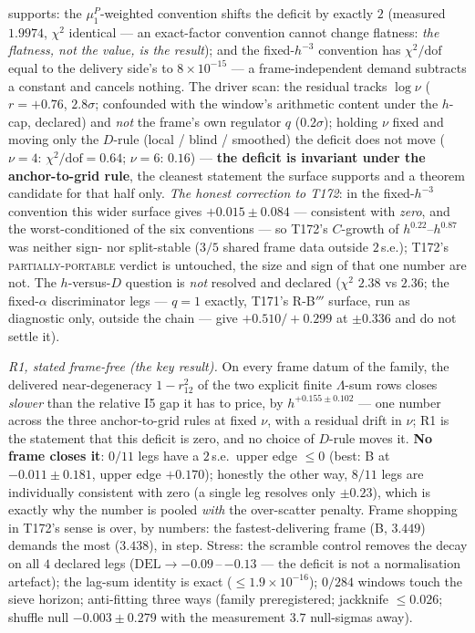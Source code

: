 \documentclass[11pt,a4paper]{article}
\begin{document}
supports: the $\mu^P_1$-weighted convention shifts the deficit by
exactly $2$ (measured $1.9974$, $\chi^2$ identical --- an exact-factor
convention cannot change flatness: \emph{the flatness, not the value,
is the result}); and the fixed-$h^{-3}$ convention has
$\chi^2/\mathrm{dof}$ equal to the delivery side's to $8\times10^{-15}$
--- a frame-independent demand subtracts a constant and cancels
nothing. The driver scan: the residual tracks $\log\nu$ ($r=+0.76$,
$2.8\sigma$; confounded with the window's arithmetic content under the
$h$-cap, declared) and \emph{not} the frame's own regulator $q$
($0.2\sigma$); holding $\nu$ fixed and moving only the $D$-rule (local
/ blind / smoothed) the deficit does not move ($\nu=4$:
$\chi^2/\mathrm{dof}=0.64$; $\nu=6$: $0.16$) --- \textbf{the deficit is
invariant under the anchor-to-grid rule}, the cleanest statement the
surface supports and a theorem candidate for that half only.
\emph{The honest correction to T172}: in the fixed-$h^{-3}$ convention
this wider surface gives $+0.015\pm0.084$ --- consistent with
\emph{zero}, and the worst-conditioned of the six conventions --- so
T172's $C$-growth of $h^{0.22}$--$h^{0.87}$ was neither sign- nor
split-stable ($3/5$ shared frame data outside $2$\,s.e.); T172's
\textsc{partially-portable} verdict is untouched, the size and sign of
that one number are not. The $h$-versus-$D$ question is \emph{not}
resolved and declared ($\chi^2$ $2.38$ vs $2.36$; the fixed-$\alpha$
discriminator legs --- $q=1$ exactly, T171's R-B$'''$ surface, run as
diagnostic only, outside the chain --- give $+0.510/+0.299$ at
$\pm0.336$ and do not settle it).

\emph{R1, stated frame-free (the key result).} On every frame datum of
the family, the delivered near-degeneracy $1-r_{12}^2$ of the two
explicit finite $\Lambda$-sum rows closes \emph{slower} than the
relative I5 gap it has to price, by $h^{+0.155\pm0.102}$ --- one number
across the three anchor-to-grid rules at fixed $\nu$, with a residual
drift in $\nu$; R1 is the statement that this deficit is zero, and no
choice of $D$-rule moves it. \textbf{No frame closes it}: $0/11$ legs
have a $2$\,s.e.\ upper edge $\le0$ (best: B at $-0.011\pm0.181$, upper
edge $+0.170$); honestly the other way, $8/11$ legs are individually
consistent with zero (a single leg resolves only $\pm0.23$), which is
exactly why the number is pooled \emph{with} the over-scatter penalty.
Frame shopping in T172's sense is over, by numbers: the
fastest-delivering frame (B, $3.449$) demands the most ($3.438$), in
step. Stress: the scramble control removes the decay on all $4$
declared legs ($\mathrm{DEL}\to-0.09$\,--\,$-0.13$ --- the deficit is
not a normalisation artefact); the lag-sum identity is exact ($\le1.9
\times10^{-16}$); $0/284$ windows touch the sieve horizon; anti-fitting
three ways (family preregistered; jackknife $\le0.026$; shuffle null
$-0.003\pm0.279$ with the measurement $3.7$ null-sigmas away).
\end{document}
